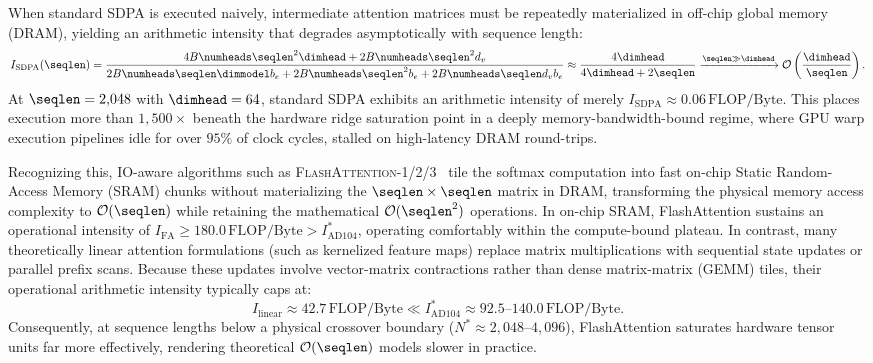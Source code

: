 When standard SDPA is executed naively, intermediate attention matrices must be repeatedly materialized in off-chip global memory (DRAM), yielding an arithmetic intensity that degrades asymptotically with sequence length:
\begin{equation}
\label{eq:arithmetic_intensity_sdpa}
I_{\text{SDPA}}(\seqlen) = \frac{4 B \numheads \seqlen^2 \dimhead + 2 B \numheads \seqlen^2 d_v}{2 B \numheads \seqlen \dimmodel b_e + 2 B \numheads \seqlen^2 b_e + 2 B \numheads \seqlen d_v b_e} \approx \frac{4 \dimhead}{4 \dimhead + 2 \seqlen} \xrightarrow{\seqlen \gg \dimhead} \mathcal{O}\left(\frac{\dimhead}{\seqlen}\right).
\end{equation}
At $\seqlen = 2{,}048$ with $\dimhead = 64$, standard SDPA exhibits an arithmetic intensity of merely $I_{\text{SDPA}} \approx 0.06\,\text{FLOP/Byte}$.
This places execution more than $1{,}500\times$ beneath the hardware ridge saturation point in a deeply memory-bandwidth-bound regime, where GPU warp execution pipelines idle for over $95\%$ of clock cycles, stalled on high-latency DRAM round-trips.

Recognizing this, IO-aware algorithms such as \textsc{FlashAttention-1/2/3}~\cite{dao2022flashattention,dao2023flashattention2,shah2024flashattention3} tile the softmax computation into fast on-chip Static Random-Access Memory (SRAM) chunks without materializing the $\seqlen \times \seqlen$ matrix in DRAM, transforming the physical memory access complexity to $\mathcal{O}(\seqlen)$ while retaining the mathematical $\mathcal{O}(\seqlen^2)$ operations.
In on-chip SRAM, FlashAttention sustains an operational intensity of $I_{\text{FA}} \ge 180.0\,\text{FLOP/Byte} > I^*_{\text{AD104}}$, operating comfortably within the compute-bound plateau.
In contrast, many theoretically linear attention formulations (such as kernelized feature maps) replace matrix multiplications with sequential state updates or parallel prefix scans.
Because these updates involve vector-matrix contractions rather than dense matrix-matrix (GEMM) tiles, their operational arithmetic intensity typically caps at:
\begin{equation}
\label{eq:arithmetic_intensity_linear}
I_{\text{linear}} \approx 42.7\,\text{FLOP/Byte} \ll I^*_{\text{AD104}} \approx 92.5\text{--}140.0\,\text{FLOP/Byte}.
\end{equation}
Consequently, at sequence lengths below a physical crossover boundary ($N^* \approx 2{,}048\text{--}4{,}096$), FlashAttention saturates hardware tensor units far more effectively, rendering theoretical $\mathcal{O}(\seqlen)$ models slower in practice.

